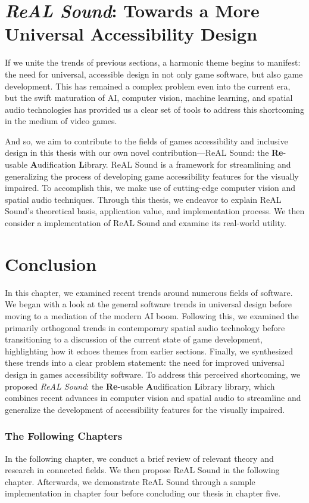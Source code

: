 \documentclass{report}
\newcommand{\rs}{ReAL Sound\xspace}
\newcommand{\rsfull}{\textbf{Re}-usable \textbf{A}udification \textbf{L}ibrary\xspace}
\begin{document}
\section{\emph{\rs}: Towards a More Universal Accessibility Design}
If we unite the trends of previous sections, a harmonic theme begins to manifest: the need for universal, accessible design in not only game software, but also game development. This has remained a complex problem even into the current era, but the swift maturation of AI, computer vision, machine learning, and spatial audio technologies has provided us a clear set of tools to address this shortcoming in the medium of video games. 

And so, we aim to contribute to the fields of games accessibility and inclusive design in this thesis with our own novel contribution---\rs: the \rsfull. \rs is a framework for streamlining and generalizing the process of developing game accessibility features for the visually impaired. To accomplish this, we make use of cutting-edge computer vision and spatial audio techniques. Through this thesis, we endeavor to explain \rs's theoretical basis, application value, and implementation process. We then consider a implementation of \rs and examine its real-world utility.


\section{Conclusion}
In this chapter, we examined recent trends around numerous fields of software. We began with a look at the general software trends in universal design before moving to a mediation of the modern AI boom. Following this, we examined the primarily orthogonal trends in contemporary spatial audio technology before transitioning to a discussion of the current state of game development, highlighting how it echoes themes from earlier sections. Finally, we synthesized these trends into a clear problem statement: the need for improved universal design in games accessibility software. To address this perceived shortcoming, we proposed \emph{\rs}: the \rsfull library, which combines recent advances in computer vision and spatial audio to streamline and generalize the development of accessibility features for the visually impaired. 

\subsubsection{The Following Chapters}
In the following chapter, we conduct a brief review of relevant theory and research in connected fields. We then propose \rs in the following chapter. Afterwards, we demonstrate \rs through a sample implementation in chapter four before concluding our thesis in chapter five.
\end{document}
